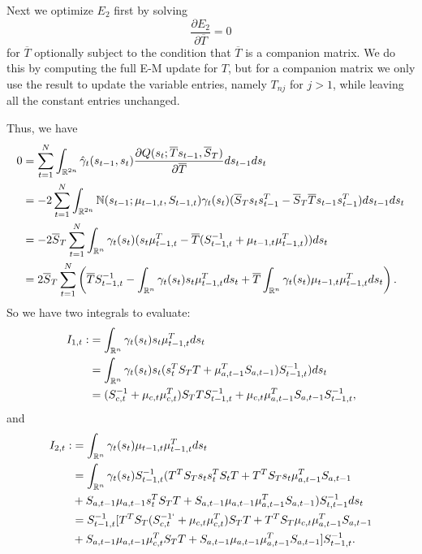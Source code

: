 \documentclass[12pt,leqno]{article}
\begin{document}
Next we optimize $E_2$ first by solving
$$
\frac{\partial{E_2}}{\partial{\overline{T}}} = 0
$$
for $\overline{T}$ optionally subject to the condition that $\overline{T}$ is a companion matrix.  We do this
by computing the full E-M update for $T$, but for a companion matrix we only use the result to update the variable entries,
namely $T_{nj}$ for $j > 1$, while leaving all the constant entries unchanged.

Thus, we have
\begin{equation}\label{T:1}
  \begin{split}
0 &= \sum_{t=1}^N\int_{{\mathbb R}^{2n}}\hat{\gamma}_t(s_{t-1},s_t)
\frac{\partial{Q(s_t;\overline{T}s_{t-1},\overline{S}_T)}}{\partial\overline{T}}ds_{t-1}ds_t \\
&= -2\sum_{t=1}^N\int_{{\mathbb R}^{2n}}{\mathbb N}(s_{t-1};\mu_{t-1,t},S_{t-1,t})\gamma_t(s_t)(\overline{S}_Ts_ts_{t-1}^T -
\overline{S}_T\overline{T}s_{t-1}s_{t-1}^T) ds_{t-1}ds_t \\
&= -2\overline{S}_T\sum_{t=1}^N\int_{{\mathbb R}^{n}}\gamma_t(s_t) (s_t\mu_{t-1,t}^T -
\overline{T}(S_{t-1,t}^{-1} + \mu_{t-1,t}\mu_{t-1,t}^T))ds_t \\
&= 2\overline{S}_T\sum_{t=1}^N\left(\overline{T}S_{t-1,t}^{-1} - \int_{{\mathbb R}^n}\gamma_t(s_t)s_t\mu_{t-1,t}^Tds_t +
\overline{T}\int_{{\mathbb R}^n}\gamma_t(s_t)\mu_{t-1,t}\mu_{t-1,t}^Tds_t\right).\\
  \end{split}
\end{equation}
So we have two integrals to evaluate:
\begin{equation}\label{I_1}
  \begin{split}
  I_{1,t} :&= \int_{{\mathbb R}^n}\gamma_t(s_t)s_t\mu_{t-1,t}^Tds_t \\
  &= \int_{{\mathbb R}^n}\gamma_t(s_t)s_t(s_t^TS_TT + \mu_{a,t-1}^TS_{a,t-1})S_{t-1,t}^{-1})ds_t \\
  &= (S_{c,t}^{-1} + \mu_{c,t}\mu_{c,t}^T)S_TTS_{t-1,t}^{-1} + \mu_{c,t}\mu_{a,t-1}^TS_{a,t-1}S_{t-1,t}^{-1},
  \end{split}
  \end{equation}
and
\begin{equation}\label{I_2}
  \begin{split}
  I_{2,t} :&= \int_{{\mathbb R}^n}\gamma_t(s_t)\mu_{t-1,t}\mu_{t-1,t}^Tds_t \\
  &= \int_{{\mathbb R}^n}\gamma_t(s_t)S_{t-1,t}^{-1}(T^TS_Ts_ts_t^TS_tT + T^TS_Ts_t\mu_{a,t-1}^TS_{a,t-1} \\
  &+ S_{a,t-1}\mu_{a,t-1}s_t^TS_TT + S_{a,t-1}\mu_{a,t-1}\mu_{a,t-1}^TS_{a,t-1}) S_{t,t-1}^{-1}ds_t \\
  &= S_{t-1,t}^{-1}[T^TS_T(S_{c,t}^{-1`}+\mu_{c,t}\mu_{c,t}^T)S_TT + T^TS_T\mu_{c,t}\mu_{a,t-1}^TS_{a,t-1} \\
  &+ S_{a,t-1}\mu_{a,t-1}\mu_{c,t}^TS_TT + S_{a,t-1}\mu_{a,t-1}\mu_{a,t-1}^TS_{a,t-1}]S_{t-1,t}^{-1}. \\
\end{split}
\end{equation}
\end{document}
